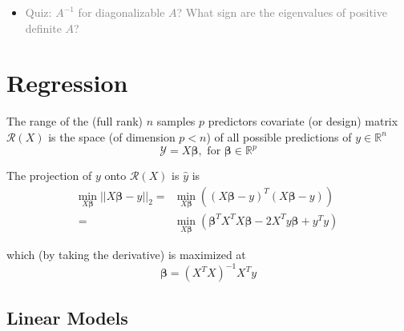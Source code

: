 \documentclass[11pt, oneside]{article}
\begin{document}
\begin{itemize}
 

\item{} \textcolor{gray}{Quiz: $A^{-1}$ for diagonalizable $A$?
What sign are the eigenvalues of positive definite $A$?}


\end{itemize}



\section{Regression}

The range of the (full rank) $n$ samples $p$ predictors covariate (or design) matrix $\mathcal{R}(X)$
is the space (of dimension $p < n$) of all possible predictions of $y \in \mathbb{R}^n$
$$\mathcal{Y} = X\boldsymbol{\beta}, \textrm{ for } \boldsymbol{\beta} \in \mathbb{R}^p$$

\noindent The projection of $y$ onto $\mathcal{R}(X)$ is $\hat y$ is 
\begin{align*} %
\underset{X\boldsymbol{\beta}}{\textrm{min}} \; || X\boldsymbol{\beta} - y ||_2 = {}& 
\underset{X\boldsymbol{\beta}}{\textrm{min}} \;  \left(\left(X\boldsymbol{\beta} - y\right)^T \left(X\boldsymbol{\beta} - y\right) \right) \\
= {}& 
\underset{X\boldsymbol{\beta}}{\textrm{min}} \; \left( \boldsymbol{\beta}^TX^TX\boldsymbol{\beta} - 2X^Ty\boldsymbol{\beta} + y^Ty \right) 
\end{align*}

\noindent which (by taking the derivative) is maximized at 
$$\boldsymbol{\beta} = \left(X^TX\right)^{-1}X^Ty$$

\subsection{Linear Models}
\end{document}
